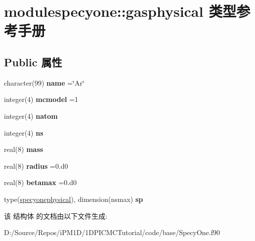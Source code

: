 \hypertarget{structmodulespecyone_1_1gasphysical}{}\section{modulespecyone\+::gasphysical 类型参考手册}
\label{structmodulespecyone_1_1gasphysical}
\subsection*{Public 属性}
\begin{DoxyCompactItemize}
\item 
\mbox{\label{structmodulespecyone_1_1gasphysical_aaa062ace57ce789192d40c085aff9057}} 
character(99) {\bfseries name} =\char`\"{}Ar\char`\"{}
\item 
\mbox{\label{structmodulespecyone_1_1gasphysical_a8b73dd89f1322546363ed4a36bafac6d}} 
integer(4) {\bfseries mcmodel} =1
\item 
\mbox{\label{structmodulespecyone_1_1gasphysical_aa0ba5703b20c8310d48bc0dba8ba1e5d}} 
integer(4) {\bfseries natom}
\item 
\mbox{\label{structmodulespecyone_1_1gasphysical_a01e2947c24cc1d7fec89897c20bd90fa}} 
integer(4) {\bfseries ns}
\item 
\mbox{\label{structmodulespecyone_1_1gasphysical_a28ab3867f8c1709bc471200da8dcc845}} 
real(8) {\bfseries mass}
\item 
\mbox{\label{structmodulespecyone_1_1gasphysical_a1f37e5f700e528355f8464ad8a8ba422}} 
real(8) {\bfseries radius} =0.d0
\item 
\mbox{\label{structmodulespecyone_1_1gasphysical_a92714e888ef299bb8bd47a046105b806}} 
real(8) {\bfseries betamax} =0.d0
\item 
\mbox{\label{structmodulespecyone_1_1gasphysical_a02699d231b3e8a29ed8cf28a4f439b64}} 
type(\mbox{\hyperlink{structmodulespecyone_1_1specyonephysical}{specyonephysical}}), dimension(nsmax) {\bfseries sp}
\end{DoxyCompactItemize}


该 结构体 的文档由以下文件生成\+:\begin{DoxyCompactItemize}
\item 
D\+:/\+Source/\+Repos/i\+P\+M1\+D/1\+D\+P\+I\+C\+M\+C\+Tutorial/code/base/Specy\+One.\+f90\end{DoxyCompactItemize}
